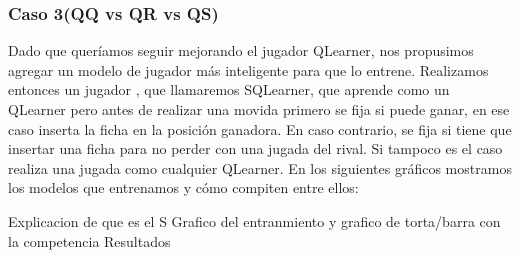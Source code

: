 \documentclass[10pt, a4paper]{article}
\begin{document}
\subsubsection{Caso 3(QQ vs QR vs QS)}

Dado que queríamos seguir mejorando el jugador QLearner, nos propusimos agregar un modelo de jugador más inteligente para que lo entrene.  Realizamos entonces un jugador , que llamaremos SQLearner, que aprende como un QLearner pero antes de realizar una movida primero se fija si puede ganar, en ese caso inserta la ficha en la posición ganadora. En caso contrario, se fija si tiene que insertar una ficha para no perder con una jugada del rival. Si tampoco es el caso realiza una jugada como cualquier QLearner.
En los siguientes gráficos mostramos los modelos que entrenamos y cómo compiten entre ellos:

Explicacion de que es el S Grafico del entranmiento y grafico de torta/barra con la competencia Resultados
\end{document}
